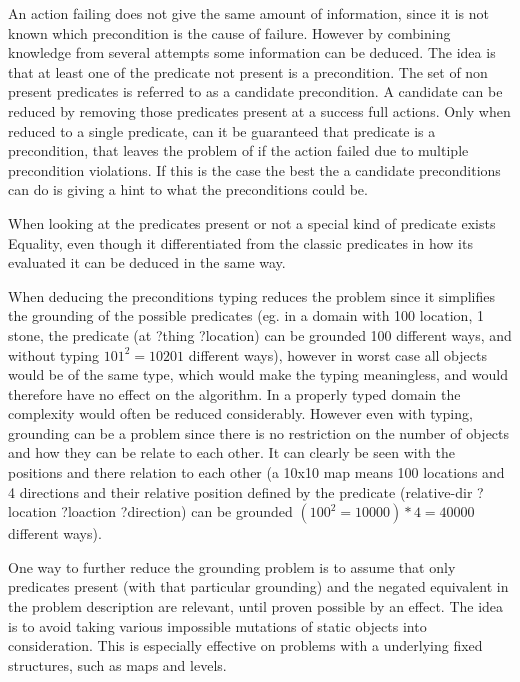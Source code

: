 	An action failing does not give the same amount of information, since it is not known which precondition is the cause of failure. However by combining knowledge from several attempts some information can be deduced. The idea is that at least one of the predicate not present is a precondition. The set of non present predicates is referred to as a candidate precondition. A candidate can be reduced by removing those predicates present at a success full actions. Only when reduced to a single predicate, can it be guaranteed that predicate is a precondition, that leaves the problem of if the action failed due to multiple precondition violations. If this is the case the best the a candidate preconditions can do is giving a hint to what the preconditions could be.
	
	
	When looking at the predicates present or not a special kind of predicate exists Equality, even though it differentiated from the classic predicates in how its evaluated it can be deduced in the same way.
	 

	
	
	
%		
%			
%	
%

	
	
			
	When deducing the preconditions typing reduces the problem since it simplifies the grounding of the possible predicates (eg. in a domain  with 100 location, 1 stone, the predicate (at ?thing ?location) can be grounded 100 different ways, and without typing $101 ^ 2 = 10201$ different ways), however in worst case all objects would be of the same type, which would make the typing meaningless, and would therefore have no effect on the algorithm. In a properly typed domain the complexity would often be reduced considerably. However even with typing, grounding can be a problem since there is no restriction on the number of objects and how they can be relate to each other. It can clearly be seen with the positions and there relation to each other (a 10x10 map means 100 locations and 4 directions and their relative position defined by the predicate (relative-dir ?location ?loaction ?direction) can be grounded $(100 ^ 2 = 10000)*4=40000$ different ways).
	
	One way to further reduce the grounding problem is to assume that only predicates present (with that particular grounding) and the negated equivalent in the problem description are relevant, until proven possible by an effect. The idea is to avoid taking various impossible mutations of static objects into consideration. This is especially effective on problems with a underlying fixed structures, such as maps and levels. %
	
